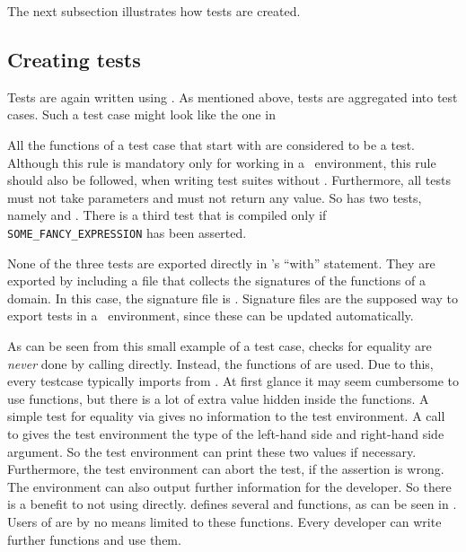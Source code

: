 The next subsection illustrates how tests are created.

\subsection{Creating tests}

Tests are again written using \Aldor. As mentioned above, tests are aggregated into test cases. Such a test case might look like the one in 


All the functions of a test case that start with  are considered to be a test. Although this rule is mandatory only for working in a \LibModel~environment, this rule should also be followed, when writing test suites without \LibModel. Furthermore, all tests must not take parameters and must not return any value. So  has two tests, namely  and . There is a third test that is compiled only if {\tt SOME\_FANCY\_EXPRESSION} has been asserted. 

None of the three tests are exported directly in 's ``with'' statement. They are exported by including a file that collects the signatures of the functions of a domain. In this case, the signature file is . Signature files are the supposed way to export tests in a \LibModel~environment, since these can be updated automatically. 

As can be seen from this small example of a test case, checks for equality are {\it never} done by calling \adname[PrimitiveType]{=} directly. Instead, the  functions of  are used. Due to this, every testcase typically imports from . At first glance it may seem cumbersome to use  functions, but there is a lot of extra value hidden inside the  functions. A simple test for equality via \adname[PrimitiveType]{=} gives no information to the test environment. A call to  gives the test environment the type of the left-hand side and right-hand side argument. So the test environment can print these two values if necessary. Furthermore, the test environment can abort the test, if the assertion is wrong. The environment can also output further information for the developer. So there is a benefit to not using \adname[PrimitiveType]{=} directly.  defines several  and  functions, as can be seen in . Users of \projectname are by no means limited to these functions. Every developer can write further  functions and use them. 

